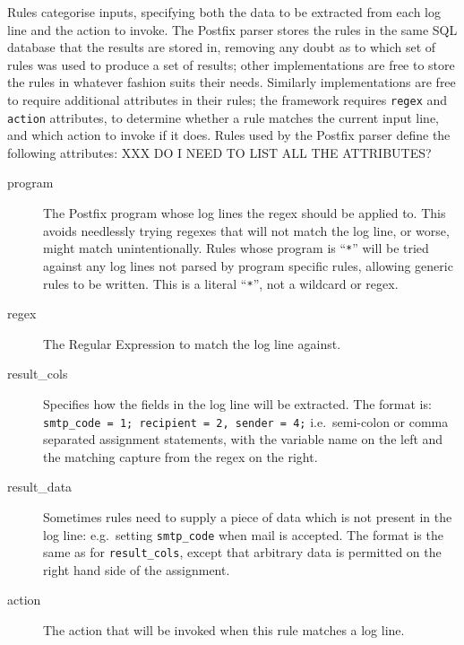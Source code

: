 \documentclass[draft]{svmult}
\newcommand{\tab}[0]{%
    \hspace*{2em}%
}
\begin{document}
\label{Rules}

Rules categorise inputs, specifying both the data to be extracted from each
log line and the action to invoke.  The Postfix parser stores the rules in
the same SQL database that the results are stored in, removing any doubt as
to which set of rules was used to produce a set of results; other
implementations are free to store the rules in whatever fashion suits their
needs.  Similarly implementations are free to require additional attributes
in their rules; the framework requires \texttt{regex} and \texttt{action}
attributes, to determine whether a rule matches the current input line, and
which action to invoke if it does.  Rules used by the Postfix parser
define the following attributes: XXX DO I NEED TO LIST ALL THE
ATTRIBUTES\@?

\begin{description}

    \item [program] The Postfix program whose log lines the regex should be
        applied to.  This avoids needlessly trying regexes that will not
        match the log line, or worse, might match unintentionally.  Rules
        whose program is ``\texttt{*}'' will be tried against any log lines
        not parsed by program specific rules, allowing generic rules to be
        written.  This is a literal ``\texttt{*}'', not a wildcard or
        regex.

    \item [regex] The Regular Expression to match the log line against.

    \item [result\_cols] Specifies how the fields in the log line will be
        extracted.  The format is:
        \tab{} \texttt{smtp\_code = 1; recipient = 2, sender = 4;} \newline
        i.e.\ semi-colon or comma separated assignment statements, with the
        variable name on the left and the matching capture from the regex
        on the right.

    \item [result\_data] Sometimes rules need to supply a piece of data
        which is not present in the log line: e.g.\ setting
        \texttt{smtp\_code} when mail is accepted.  The format is the same
        as for \texttt{result\_cols}, except that arbitrary data is
        permitted on the right hand side of the assignment.

    \item [action] The action that will be invoked when this rule matches a
        log line.


\end{description}
\end{document}
